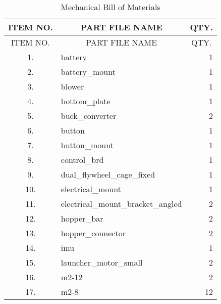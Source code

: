 \begin{longtable}{clr}
	\caption{Mechanical Bill of Materials}	\label{tab:mech_bom}\\
	\toprule
	ITEM NO. & \multicolumn{1}{c}{PART FILE NAME}      & \multicolumn{1}{c}{QTY.} \\ 
	\midrule
	\endfirsthead
	
	\toprule
	ITEM NO. & \multicolumn{1}{c}{PART FILE NAME}      & \multicolumn{1}{c}{QTY.} \\ 
	\midrule
	\endhead

	1.        & battery                                 & 1                        \\ 
	2.        & battery\_mount                          & 1                        \\ 
	3.        & blower                                  & 1                        \\ 
	4.        & bottom\_plate                           & 1                        \\ 
	5.        & buck\_converter                         & 2                        \\ 
	6.        & button                                  & 1                        \\ 
	7.        & button\_mount                           & 1                        \\ 
	8.        & control\_brd                            & 1                        \\ 
	9.        & dual\_flywheel\_cage\_fixed             & 1                        \\ 
	10.       & electrical\_mount                       & 1                        \\ 
	11.       & electrical\_mount\_bracket\_angled      & 2                        \\ 
	12.       & hopper\_bar                             & 2                        \\ 
	13.       & hopper\_connector                       & 2                        \\ 
	14.       & imu                                     & 1                        \\ 
	15.       & launcher\_motor\_small                  & 2                        \\ 
	16.       & m2-12                                   & 2                        \\ 
	17.       & m2-8                                    & 12                       \\ 

\end{longtable}
